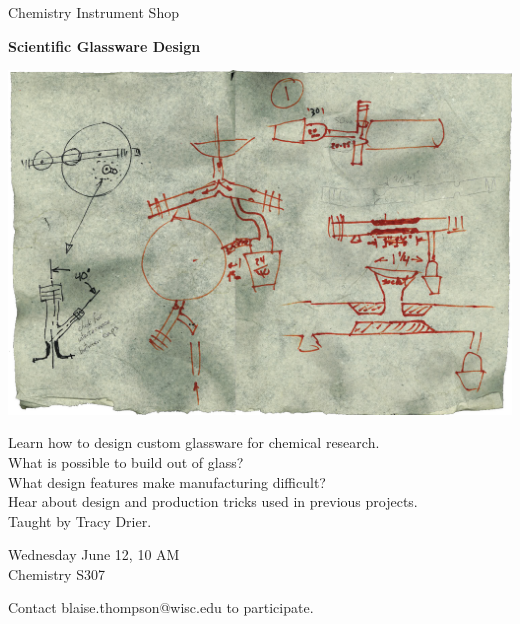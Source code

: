 \documentclass{article}
\begin{document}
\center

\Huge

Chemistry Instrument Shop

\textbf{
Scientific Glassware Design
}

\includegraphics[width=\linewidth]{coverart.png}

{
\LARGE
Learn how to design custom glassware for chemical research. \\
What is possible to build out of glass? \\
What design features make manufacturing difficult? \\
Hear about design and production tricks used in previous projects. \\
Taught by Tracy Drier. \\
}

\vfill

{
\huge
Wednesday June 12, 10 AM \\
Chemistry S307
}

\vfill

{
\huge
Contact blaise.thompson@wisc.edu to participate.
}
\end{document}
